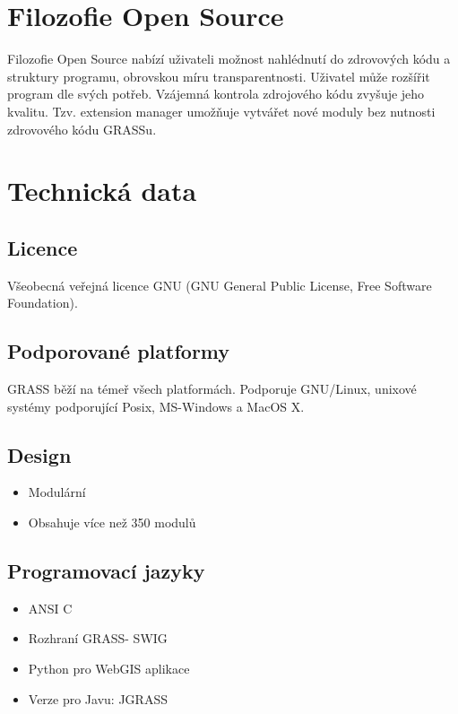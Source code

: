 \documentclass[notumble,a4paper,10pt,nofoldmark]{leaflet}
\begin{document}
\section{Filozofie Open Source}

Filozofie Open Source nabízí uživateli možnost nahlédnutí do
zdrovových kódu a struktury programu, obrovskou míru
transparentnosti. Uživatel může rozšířit program dle svých
potřeb. Vzájemná kontrola zdrojového kódu zvyšuje jeho
kvalitu. Tzv. extension manager umožňuje vytvářet nové moduly bez
nutnosti zdrovového kódu GRASSu.

\section{Technická data}

\subsection{Licence}

Všeobecná veřejná licence GNU (GNU General Public License, Free
Software Foundation).

\subsection{Podporované platformy}

GRASS běží na témeř všech platformách. Podporuje GNU/Linux, unixové
systémy podporující Posix, MS-Windows a MacOS X.

\subsection{Design}

\begin{itemize}
\item Modulární
\item Obsahuje více než 350 modulů
\end{itemize}

\subsection{Programovací jazyky}

\begin{itemize}
\item ANSI C
\item Rozhraní GRASS- SWIG
\item Python pro WebGIS aplikace
\item Verze pro Javu: JGRASS
\end{itemize}
\end{document}
